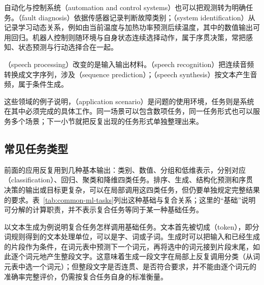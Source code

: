 自动化与控制系统（automation and control systems）也可以把观测转为明确任务。（fault diagnosis）依据传感器记录判断故障类别；（system identification）从记录学习动态关系，例如由当前温度与加热功率预测后续温度，其中的数值输出可用回归。机器人控制则随环境与自身状态连续选择动作，属于序贯决策，常把感知、状态预测与行动选择合在一起。

（speech processing）改变的是输入输出材料。（speech recognition）把连续音频转换成文字序列，涉及（sequence prediction）；（speech synthesis）按文本产生音频，属于条件生成。

这些领域的例子说明，（application scenario）是问题的使用环境，任务则是系统在其中必须完成的具体工作。同一场景可以包含数项任务，同一任务形式也可以服务多个场景；下一小节就把反复出现的任务形式单独整理出来。

\subsection{常见任务类型}

前面的应用反复用到几种基本输出：类别、数值、分组和低维表示，分别对应（classification）、回归、聚类和降维四类任务。排序、生成、结构化预测和序贯决策的输出或目标更复杂，可以在局部调用这四类任务，但仍要单独规定完整结果的要求。表~\ref{tab:common-ml-tasks}列出这种基础与复合关系；这里的“基础”说明可分解的计算职责，并不表示复合任务等同于某一种基础任务。

以文本生成为例说明复合任务怎样调用基础任务。文本首先被切成（token），即分词规则得到的文本处理单位，可以是字、词或子词。生成时可以把输入和已经生成的片段作为条件，在词元表中预测下一个词元，再将选中的词元接到片段末尾，如此逐个词元地产生整段文字。这意味着生成一段文字在局部上反复调用分类（从词元表中选一个词元）；但整段文字是否连贯、是否符合要求，并不能由逐个词元的准确率完整评价，仍需按复合任务自身的标准衡量。

